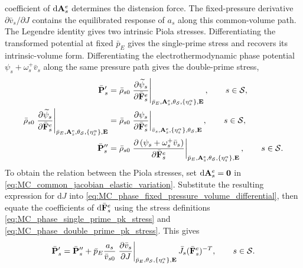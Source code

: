 coefficient of \(\mathrm d\mathbf{A}_s^e\) determines the distension force.  The
fixed-pressure derivative \(\partial\bar v_s/\partial J\) contains the
equilibrated response of \(a_s\) along this common-volume path.
%
The Legendre identity gives two intrinsic Piola stresses.  Differentiating the
transformed potential at fixed \(\bar p_E\) gives the single-prime stress and
recovers its intrinsic-volume form.  Differentiating the electrothermodynamic
phase potential \(\psi_s+\omega_s^+\bar v_s\) along the same pressure path gives
the double-prime stress,
%
\begin{subequations}
	\label{eq:MC_phase_pk_stresses}
	\begin{align}
		\bar{\mathbf{P}}_s'
		 & =
		\bar\rho_{s0}
		\left.
		\frac{\partial \widetilde\psi_s}{\partial \bar{\mathbf{F}}_s^e}
		\right\vert_{\bar p_E,\mathbf{A}_s^e,\theta_{\mathcal{S}},
			\{\eta_s^\alpha\},\mathbf{E}},
		\qquad
		s\in\mathcal{S},
		\label{eq:MC_phase_single_prime_pk_stress} \\
		\bar\rho_{s0}
		\left.
		\frac{\partial \widetilde\psi_s}{\partial \bar{\mathbf{F}}_s^e}
		\right\vert_{\bar p_E,\mathbf{A}_s^e,\theta_{\mathcal{S}},
			\{\eta_s^\alpha\},\mathbf{E}}
		 & =
		\bar\rho_{s0}
		\left.
		\frac{\partial \psi_s}{\partial \bar{\mathbf{F}}_s^e}
		\right\vert_{\bar v_s,\mathbf{A}_s^e,\{\eta_s^\alpha\},
			\theta_{\mathcal{S}},\mathbf{E}},
		\qquad
		s\in\mathcal{S},
		\label{eq:MC_phase_legendre_pk_identity}   \\
		\bar{\mathbf{P}}_s^{\prime\prime}
		 & =
		\bar\rho_{s0}
		\left.
		\frac{\partial 
			\left(
			\psi_s+\omega_s^+\bar v_s
			\right)
		}{\partial \bar{\mathbf{F}}_s^e}
		\right\vert_{\bar p_E,\mathbf{A}_s^e,\theta_{\mathcal{S}},
			\{\eta_s^\alpha\},\mathbf{E}},
		\qquad
		s\in\mathcal{S} .
		\label{eq:MC_phase_double_prime_pk_stress}
	\end{align}
\end{subequations}
%
To obtain the relation between the Piola stresses, set
\(\mathrm d\mathbf{A}_s^e=\mathbf{0}\) in
\eqref{eq:MC_common_jacobian_elastic_variation}.  Substitute the resulting
expression for \(\mathrm dJ\) into
\eqref{eq:MC_phase_fixed_pressure_volume_differential}, then equate the
coefficients of \(\mathrm d\bar{\mathbf{F}}_s^e\) using the stress definitions
\eqref{eq:MC_phase_single_prime_pk_stress} and
\eqref{eq:MC_phase_double_prime_pk_stress}.  This gives
%
\begin{equation}
	\bar{\mathbf{P}}_s'
	=
	\bar{\mathbf{P}}_s^{\prime\prime}
	+
	\bar p_E
	\frac{a_s}{\bar v_{s0}}
	\left.
	\frac{\partial \bar v_s}{\partial J}
	\right\vert_{\bar p_E,\theta_{\mathcal{S}},\{\eta_s^\alpha\},\mathbf{E}}
	\bar J_s
	(\bar{\mathbf{F}}_s^e)^{-T},
	\qquad
	s\in\mathcal{S} .
	\label{eq:MC_phase_pk_legendre_split}
\end{equation}

